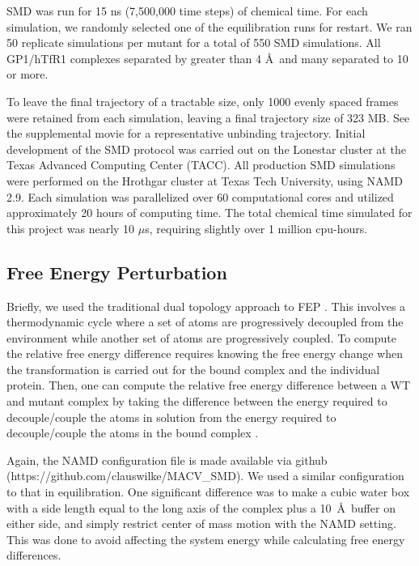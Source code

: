 \documentclass[12pt]{article}
\begin{document}
SMD was run for 15 ns (7,500,000 time steps) of chemical time. For each simulation, we randomly selected one of the equilibration runs for restart. We ran 50 replicate simulations per mutant for a total of 550 SMD simulations. All GP1/hTfR1 complexes separated by greater than 4 \AA\ and many separated to 10 or more.

To leave the final trajectory of a tractable size, only 1000 evenly spaced frames were retained from each simulation, leaving a final trajectory size of 323 MB. See the supplemental movie for a representative unbinding trajectory. Initial development of the SMD protocol was carried out on the Lonestar cluster at the Texas Advanced Computing Center (TACC). All production SMD simulations were performed on the Hrothgar cluster at Texas Tech University, using NAMD 2.9. Each simulation was parallelized over 60 computational cores and utilized approximately 20 hours of computing time. The total chemical time simulated for this project was nearly 10 $\mu$s, requiring slightly over 1 million cpu-hours.

\subsection{Free Energy Perturbation}

Briefly, we used the traditional dual topology approach to FEP \citep{Gao2006,Pearlman1994}. This involves a thermodynamic cycle where a set of atoms are progressively decoupled from the environment while another set of atoms are progressively coupled. To compute the relative free energy difference requires knowing the free energy change when the transformation is carried out for the bound complex and the individual protein. Then, one can compute the relative free energy difference between a WT and mutant complex by taking the difference between the energy required to decouple/couple the atoms in solution from the energy required to decouple/couple the atoms in the bound complex \citep{Gao2006,Pearlman1994}.

Again, the NAMD configuration file is made available via github (https://github.com/clauswilke/MACV\_SMD). We used a similar configuration to that in equilibration. One significant difference was to make a cubic water box with a side length equal to the long axis of the complex plus a 10~\AA\  buffer on either side, and simply restrict center of mass motion with the NAMD setting. This was done to avoid affecting the system energy while calculating free energy differences. 
\end{document}
